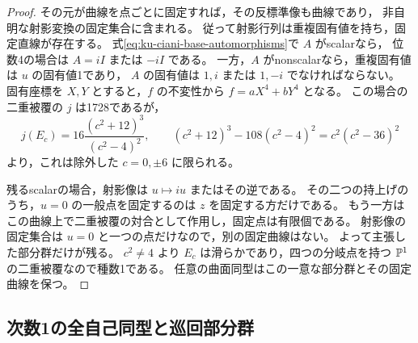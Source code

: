 \begin{proof}
その元が曲線を点ごとに固定すれば，その反標準像も曲線であり，
非自明な射影変換の固定集合に含まれる。
従って射影行列は重複固有値を持ち，固定直線が存在する。
式\eqref{eq:ku-ciani-base-automorphisms}で $A$ がscalarなら，
位数4の場合は $A=iI$ または $-iI$ である。
一方，$A$ がnonscalarなら，重複固有値は $u$ の固有値1であり，
$A$ の固有値は $1,i$ または $1,-i$ でなければならない。
固有座標を $X,Y$ とすると，$f$ の不変性から $f=aX^4+bY^4$ となる。
この場合の二重被覆の $j$ は1728であるが，
\begin{equation}\label{eq:ku-ciani-fixed-j}
 j(E_c)=16\frac{(c^2+12)^3}{(c^2-4)^2},\qquad
 (c^2+12)^3-108(c^2-4)^2=c^2(c^2-36)^2
\end{equation}
より，これは除外した $c=0,\pm6$ に限られる。

残るscalarの場合，射影像は $u\mapsto iu$ またはその逆である。
その二つの持上げのうち，$u=0$ の一般点を固定するのは $z$ を固定する方だけである。
もう一方はこの曲線上で二重被覆の対合として作用し，固定点は有限個である。
射影像の固定集合は $u=0$ と一つの点だけなので，別の固定曲線はない。
よって主張した部分群だけが残る。
$c^2\ne4$ より $E_c$ は滑らかであり，四つの分岐点を持つ
$\mathbb P^1$ の二重被覆なので種数1である。
任意の曲面同型はこの一意な部分群とその固定曲線を保つ。
\end{proof}

\subsection{次数1の全自己同型と巡回部分群}

